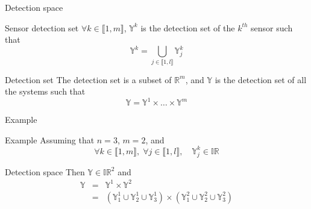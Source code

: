 \documentclass{beamer}
\begin{document}
            \begin{frame}{Detection space}
                \begin{block}{Sensor detection set}
                    $\forall k \in \llbracket 1, m\rrbracket$, $\mathbb{Y}^k$ is the detection set of the $k^{th}$ sensor such that
                    \begin{equation}
                        \mathbb{Y}^k = \bigcup_{j \in \llbracket 1, l\rrbracket} \mathbb{Y}_j^k
                    \end{equation}
                \end{block}
                \begin{block}{Detection set}
                    The detection set is a subset of $\mathbb{R}^m$, and $\mathbb{Y}$ is the detection set of all the systems such that
                    \begin{equation}
                        \mathbb{Y} = \mathbb{Y}^1 \times \dots \times \mathbb{Y}^m
                    \end{equation}
                \end{block}
            \end{frame}

            \begin{frame}{Example}
                \begin{exampleblock}{Example}
                    Assuming that $n = 3$, $m = 2$, and
                    $$\forall k \in \llbracket 1, m\rrbracket, \;  \forall j \in \llbracket 1, l\rrbracket, \quad \mathbb{Y}_j^k \in \mathbb{IR}$$
                \end{exampleblock}
                \begin{exampleblock}{Detection space}
                    Then $\mathbb{Y} \in \mathbb{IR}^2$ and
                    \begin{eqnarray}
                        \mathbb{Y} & = & \mathbb{Y}^1 \times \mathbb{Y}^2 \\
                        & = & \left(\mathbb{Y}_1^1 \cup \mathbb{Y}_2^1 \cup \mathbb{Y}_3^1\right) \times \left(\mathbb{Y}_1^2 \cup \mathbb{Y}_2^2 \cup \mathbb{Y}_3^2\right)
                    \end{eqnarray}
                \end{exampleblock}
            \end{frame}
\end{document}
